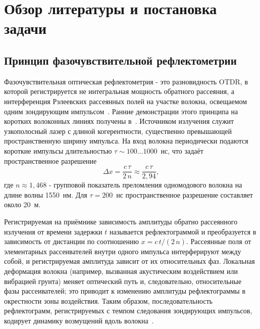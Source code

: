 \documentclass[12pt,a4paper]{extarticle}
\begin{document}
\newpage

\section{Обзор литературы и постановка задачи}

\subsection{Принцип фазочувствительной рефлектометрии}
\label{sec:principle}

Фазочувствительная оптическая рефлектометрия - это разновидность OTDR, в которой регистрируется не интегральная мощность обратного рассеяния, а интерференция Рэлеевских рассеянных полей на участке волокна, освещаемом одним зондирующим импульсом~\cite{Lu2019, Palmieri2013, Bao2012, Muanenda2018}. Ранние демонстрации этого принципа на коротких волоконных линиях получены в~\cite{Posey2000, Juarez2005}. Источником излучения служит узкополосный лазер с длиной когерентности, существенно превышающей пространственную ширину импульса. На вход волокна периодически подаются короткие импульсы длительностью $\tau \sim 100\dots 1000$~нс, что задаёт пространственное разрешение
\begin{equation}
  \Delta x = \frac{c\,\tau}{2\,n} \approx \frac{c\,\tau}{2{,}94},
  \label{eq:resolution}
\end{equation}
где $n \approx 1{,}468$ - групповой показатель преломления одномодового волокна на длине волны 1550~нм. Для $\tau = 200$~нс пространственное разрешение составляет около 20~м.

Регистрируемая на приёмнике зависимость амплитуды обратно рассеянного излучения от времени задержки $t$ называется рефлектограммой и преобразуется в зависимость от дистанции по соотношению $x = c\,t / (2\,n)$. Рассеянные поля от элементарных рассеивателей внутри одного импульса интерферируют между собой, и регистрируемая амплитуда зависит от их относительных фаз. Локальная деформация волокна (например, вызванная акустическим воздействием или вибрацией грунта) меняет оптический путь и, следовательно, относительные фазы рассеивателей; это приводит к изменению амплитуды рефлектограммы в окрестности зоны воздействия. Таким образом, последовательность рефлектограмм, регистрируемых с темпом следования зондирующих импульсов, кодирует динамику возмущений вдоль волокна~\cite{Lu2010}.
\end{document}
